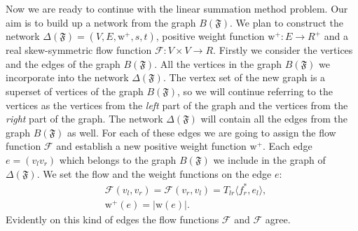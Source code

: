 \documentclass[12pt]{article}
\newcommand\inner[2]{\langle #1, #2 \rangle}
\theoremstyle{definition}
\newcommand{\fsys}{\mathfrak{F}}
\newcommand{\wt}{\mathrm{w}}
\newcommand{\wtp}{\mathrm{w}^{+}}
\newcommand{\flow}{\mathcal{F}}
\newcommand{\flowsgn}{\flow}
\newcommand{\net}{\Delta}
\numberwithin{remark}{section}
\numberwithin{theorem}{section}
\numberwithin{prop}{section}
\numberwithin{equation}{section}
\numberwithin{lemma}{section}
\numberwithin{prop_under_lemma}{lemma}
\begin{document}
    Now we are ready to continue with the linear summation method problem.
    Our aim is to build up a network from the graph $B(\fsys)$.
    We plan to construct the network $\net(\fsys) = (V, E, \wtp, s, t)$,
    positive weight function $\wtp: E \to R^{+}$ and a real skew-symmetric flow function $\flow: V \times V \to R$.
    Firstly we consider the vertices and the edges of the graph $B(\fsys)$.
    All the vertices in the graph $B(\fsys)$ we incorporate into the network $\net(\fsys)$.
    The vertex set of the new graph is a superset of vertices of the graph $B(\fsys)$,
    so we will continue referring to the vertices as the vertices from 
    the \textit{left} part of the graph and the vertices from the \textit{right} part of the graph.
    The network $\net(\fsys)$ will contain all the edges from the graph $B(\fsys)$ as well.
    For each of these edges we are going to assign the flow function $\flow$ and
    establish a new positive weight function $\wtp$.
    Each edge $e = (v_l v_r)$ which belongs to the graph $B(\fsys)$ we include in the graph of $\net(\fsys)$.
    We set the flow and the weight functions on the edge $e$:
    \begin{align*}
      &\flow(v_l, v_r) = \flowsgn(v_r, v_l) = T_{lr} \inner{f^*_r}{e_l},\\
      &\wtp(e) = \left| \wt(e) \right|.
    \end{align*}
    Evidently on this kind of edges the flow functions $\flowsgn$ and $\flow$ agree.
    
\end{document}
